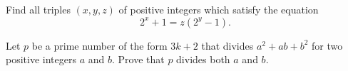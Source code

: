\documentclass{subfile}
\begin{document}
	
	\begin{problem}
		Find all triples $(x,y,z)$ of positive integers which satisfy the equation $$2^x+1=z(2^y-1).$$ %
	\end{problem}
	
	
	
	\begin{problem}
		Let $p$ be a prime number of the form $3k+2$ that divides $a^2+ab+b^2$ for two positive integers $a$ and $b$. Prove that $p$ divides both $a$ and $b$. %
	\end{problem}
	
	
\end{document}
